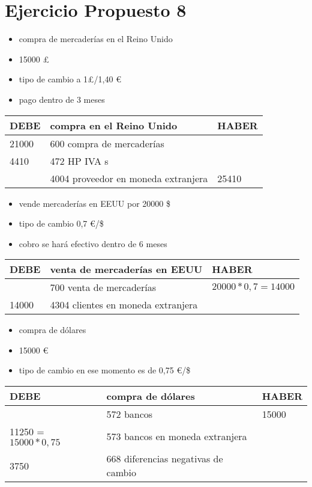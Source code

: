 \documentclass[a4paper,12pt]{article}
\begin{document}
\section{Ejercicio Propuesto 8}
\begin{itemize}
    \item compra de mercaderías en el Reino Unido
    \item 15000 \pounds
    \item tipo de cambio a 1\pounds/1,40 \euro
    \item pago dentro de 3 meses
\end{itemize}
\begin{table}[H]
    \centering
    \begin{tabular}{|p{3cm}|p{6cm}|p{3cm}|}
    \hline
    \textbf{DEBE} & \textbf{compra en el Reino Unido} & \textbf{HABER} \\
    \hline
    21000 & 600 compra de mercaderías & \\
    \hline
    4410 & 472 HP IVA s & \\
    \hline
    & 4004 proveedor en moneda extranjera & 25410 \\
    \hline
    \end{tabular}
\end{table}
\begin{itemize}
    \item vende mercaderías en EEUU por 20000 \$
    \item tipo de cambio 0,7 \euro/\$
    \item cobro se hará efectivo dentro de 6 meses
\end{itemize}
\begin{table}[H]
    \centering
    \begin{tabular}{|p{3cm}|p{6cm}|p{3cm}|}
    \hline
    \textbf{DEBE} & \textbf{venta de mercaderías en EEUU} & \textbf{HABER} \\
    \hline
    & 700 venta de mercaderías& $20000*0,7 = 14000$\\
    \hline
    14000& 4304 clientes en moneda extranjera& \\
    \hline
    \end{tabular}
\end{table}

\begin{itemize}
    \item compra de dólares
    \item 15000 \euro
    \item tipo de cambio en ese momento es de 0,75 \euro/\$
\end{itemize}
\begin{table}[H]
    \centering
    \begin{tabular}{|p{3cm}|p{6cm}|p{3cm}|}
    \hline
    \textbf{DEBE} & \textbf{compra de dólares} & \textbf{HABER} \\
    \hline
    & 572 bancos& 15000\\
    \hline
    11250 = $15000*0,75$& 573 bancos en moneda extranjera& \\
    \hline
    3750& 668 diferencias negativas de cambio& \\
    \hline
    \end{tabular}
\end{table}
\end{document}
